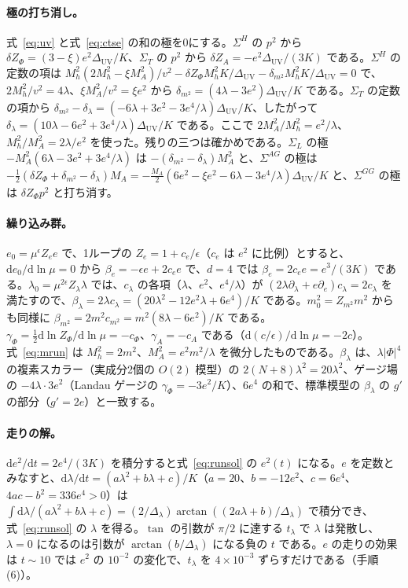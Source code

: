 \documentclass[a4paper,10pt]{ltjsarticle}
\newcommand{\dd}{\mathrm{d}}
\newcommand{\DUV}{\Delta_{\mathrm{UV}}}
\begin{document}
\paragraph{極の打ち消し。}式~\eqref{eq:uv} と式~\eqref{eq:ctse} の和の極を0にする。$\Sigma^H$ の $p^2$ から $\delta Z_\Phi=(3-\xi)e^2\DUV/K$、$\Sigma_T$ の $p^2$ から $\delta Z_A=-e^2\DUV/(3K)$ である。$\Sigma^H$ の定数の項は $M_h^2(2M_h^2-\xi M_A^2)/v^2-\delta Z_\Phi M_h^2K/\DUV-\delta_{m^2}M_h^2K/\DUV=0$ で、$2M_h^2/v^2=4\lambda$、$\xi M_A^2/v^2=\xi e^2$ から $\delta_{m^2}=(4\lambda-3e^2)\DUV/K$ である。$\Sigma_T$ の定数の項から $\delta_{m^2}-\delta_\lambda=(-6\lambda+3e^2-3e^4/\lambda)\DUV/K$、したがって $\delta_\lambda=(10\lambda-6e^2+3e^4/\lambda)\DUV/K$ である。ここで $2M_A^2/M_h^2=e^2/\lambda$、$M_h^2/M_A^2=2\lambda/e^2$ を使った。残りの三つは確かめである。$\Sigma_L$ の極 $-M_A^2(6\lambda-3e^2+3e^4/\lambda)$ は $-(\delta_{m^2}-\delta_\lambda)M_A^2$ と、$\Sigma^{AG}$ の極は $-\frac12(\delta Z_\Phi+\delta_{m^2}-\delta_\lambda)M_A=-\frac{M_A}2(6e^2-\xi e^2-6\lambda-3e^4/\lambda)\DUV/K$ と、$\Sigma^{GG}$ の極は $\delta Z_\Phi p^2$ と打ち消す。

\paragraph{繰り込み群。}$e_0=\mu^\epsilon Z_ee$ で、1ループの $Z_e=1+c_e/\epsilon$（$c_e$ は $e^2$ に比例）とすると、$\dd e_0/\dd\ln\mu=0$ から $\beta_e=-\epsilon e+2c_ee$ で、$d=4$ では $\beta_e=2c_ee=e^3/(3K)$ である。$\lambda_0=\mu^{2\epsilon}Z_\lambda\lambda$ では、$c_\lambda$ の各項（$\lambda$、$e^2$、$e^4/\lambda$）が $(2\lambda\partial_\lambda+e\partial_e)c_\lambda=2c_\lambda$ を満たすので、$\beta_\lambda=2\lambda c_\lambda=(20\lambda^2-12e^2\lambda+6e^4)/K$ である。$m_0^2=Z_{m^2}m^2$ からも同様に $\beta_{m^2}=2m^2c_{m^2}=m^2(8\lambda-6e^2)/K$ である。$\gamma_\Phi=\frac12\dd\ln Z_\Phi/\dd\ln\mu=-c_\Phi$、$\gamma_A=-c_A$ である（$\dd(c/\epsilon)/\dd\ln\mu=-2c$）。式~\eqref{eq:mrun} は $M_h^2=2m^2$、$M_A^2=e^2m^2/\lambda$ を微分したものである。$\beta_\lambda$ は、$\lambda|\Phi|^4$ の複素スカラー（実成分2個の $O(2)$ 模型）の $2(N+8)\lambda^2=20\lambda^2$、ゲージ場の $-4\lambda\cdot3e^2$（Landau ゲージの $\gamma_\Phi=-3e^2/K$）、$6e^4$ の和で、標準模型の $\beta_\lambda$ の $g'$ の部分（$g'=2e$）と一致する。

\paragraph{走りの解。}$\dd e^2/\dd t=2e^4/(3K)$ を積分すると式~\eqref{eq:runsol} の $e^2(t)$ になる。$e$ を定数とみなすと、$\dd\lambda/\dd t=(a\lambda^2+b\lambda+c)/K$（$a=20$、$b=-12e^2$、$c=6e^4$、$4ac-b^2=336e^4>0$）は $\int\dd\lambda/(a\lambda^2+b\lambda+c)=(2/\Delta_\lambda)\arctan((2a\lambda+b)/\Delta_\lambda)$ で積分でき、式~\eqref{eq:runsol} の $\lambda$ を得る。$\tan$ の引数が $\pi/2$ に達する $t_\lambda$ で $\lambda$ は発散し、$\lambda=0$ になるのは引数が $\arctan(b/\Delta_\lambda)$ になる負の $t$ である。$e$ の走りの効果は $t\sim10$ では $e^2$ の $10^{-2}$ の変化で、$t_\lambda$ を $4\times10^{-3}$ ずらすだけである（手順 (6)）。
\end{document}
